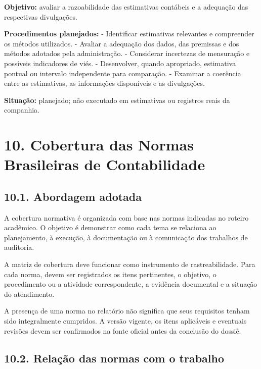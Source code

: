 \documentclass[
]{article}
\begin{document}
\textbf{Objetivo:} avaliar a razoabilidade das estimativas contábeis e a
adequação das respectivas divulgações.

\textbf{Procedimentos planejados:} - Identificar estimativas relevantes
e compreender os métodos utilizados. - Avaliar a adequação dos dados,
das premissas e dos métodos adotados pela administração. - Considerar
incertezas de mensuração e possíveis indicadores de viés. - Desenvolver,
quando apropriado, estimativa pontual ou intervalo independente para
comparação. - Examinar a coerência entre as estimativas, as informações
disponíveis e as divulgações.

\textbf{Situação:} planejado; não executado em estimativas ou registros
reais da companhia.

\section{10. Cobertura das Normas Brasileiras de
Contabilidade}\label{cobertura-das-normas-brasileiras-de-contabilidade}

\subsection{10.1. Abordagem adotada}\label{abordagem-adotada}

A cobertura normativa é organizada com base nas normas indicadas no
roteiro acadêmico. O objetivo é demonstrar como cada tema se relaciona
ao planejamento, à execução, à documentação ou à comunicação dos
trabalhos de auditoria.

A matriz de cobertura deve funcionar como instrumento de
rastreabilidade. Para cada norma, devem ser registrados os itens
pertinentes, o objetivo, o procedimento ou a atividade correspondente, a
evidência documental e a situação do atendimento.

A presença de uma norma no relatório não significa que seus requisitos
tenham sido integralmente cumpridos. A versão vigente, os itens
aplicáveis e eventuais revisões devem ser confirmados na fonte oficial
antes da conclusão do dossiê.

\subsection{10.2. Relação das normas com o
trabalho}\label{relauxe7uxe3o-das-normas-com-o-trabalho}
\end{document}

